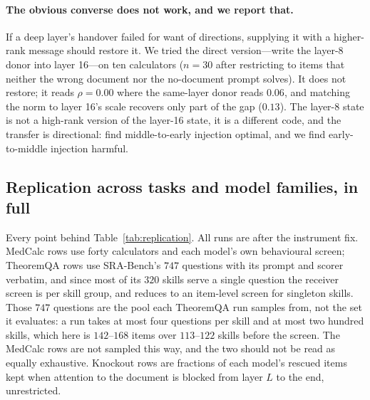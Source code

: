 \documentclass{article}
\begin{document}
\paragraph{The obvious converse does not work, and we report that.} If a deep
layer's handover failed for want of directions, supplying it with a higher-rank
message should restore it. We tried the direct version---write the layer-8
donor into layer 16---on ten calculators ($n=30$ after restricting to items that
neither the wrong document nor the no-document prompt solves). It does not
restore; it reads $\rho = 0.00$ where the same-layer donor reads $0.06$,
and matching the norm to layer 16's scale recovers only part of the gap
($0.13$). The layer-8 state is not a high-rank version of the layer-16 state, it
is a different code, and the transfer is directional:
\citet{ardoin2026promptcompression} find middle-to-early injection optimal, and
we find early-to-middle injection harmful.

\subsection{Replication across tasks and model families, in full}
\label{app:replication}

Every point behind Table~\ref{tab:replication}. All runs are after the
instrument fix. MedCalc rows use forty calculators and each model's own
behavioural screen; TheoremQA rows use SRA-Bench's $747$ questions with its
prompt and scorer verbatim, and since most of its $320$ skills serve a single
question the receiver screen is per skill group, and reduces to an item-level screen for singleton skills.
Those $747$ questions are the pool each TheoremQA run samples from, not the set
it evaluates: a run takes at most four questions per skill and at most two
hundred skills, which here is $142$--$168$ items over $113$--$122$ skills before
the screen. The MedCalc rows are not sampled this way, and the two should not be
read as equally exhaustive. Knockout rows are fractions of each
model's rescued items kept when attention to the document is blocked from layer
$L$ to the end, unrestricted.

\begin{table}[h]
\caption{The replication curves. Battery, sufficiency and rank are $\rho$
(Eq.~\ref{eq:rho}) on the restricted split; necessity is the fraction of rescued
items kept. ``Another family'' (MedCalc) and ``another skill'' (TheoremQA) are
the transfer controls available in each set.}
\label{tab:replicationfull}
\centering
\scriptsize
\setlength{\tabcolsep}{3pt}

\end{table}
\end{document}
